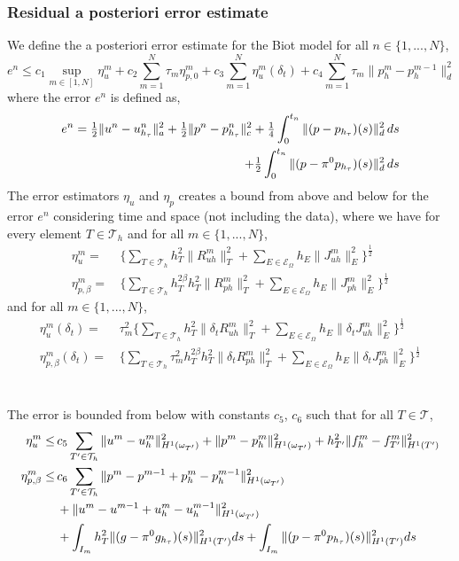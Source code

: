 \subsubsection{Residual a posteriori error estimate} \label{biot:res_err}
We define the a posteriori error estimate for the Biot model for all $n \in \{1,...,N\}$,
\begin{equation} \label{biot_e_upper_bd}
e^n \leq c_1\sup_{m \in [1,N]} \eta^m_u + c_2 \sum_{m=1}^N \tau_m \eta^m_{p,0} + c_3\sum_{m=1}^N \eta^m_u(\delta_t)+ c_4\sum_{m=1}^N \tau_m \|p^m_h - p^{m-1}_h\|_d^2
\end{equation}
where the error $e^n$ is defined as,
\begin{align}
e^n = \tfrac{1}{2}\|u^n - u^n_{h_\tau} \|^2_a + \tfrac{1}{2}\|p^n - p^n_{h_\tau} \|^2_c
+ \tfrac{1}{4}\int_0^{t_n} \|(p - p_{h_\tau})(s) \|^2_d \, ds \\
+ \tfrac{1}{2}\int_0^{t_n} \|(p - \pi^0p_{h_\tau})(s) \|^2_d \, ds \notag
\end{align}
The error estimators $\eta_u$ and $\eta_p$ creates a bound from above and below for the error $e^n$ considering time and space (not including the data), where we have for every element $T \in \mathcal{T}_h$ and for all $m \in \{1,...,N\}$,
\begin{align}
\eta^m_u = & \,\bigl\{\sum_{T \in \mathcal{T}_h} h_T^2 \|R^m_{uh}\|_T^2 + \sum_{E \in \mathcal{E}_\Omega} h_E \|J^m_{uh}\|_E^2 \bigr\}^{\frac{1}{2}} \\
\eta^m_{p,\beta} = & \, \bigl\{\sum_{T \in \mathcal{T}_h} h_T^{2\beta} h_T^2 \|R^m_{ph}\|_T^2  + \sum_{E \in \mathcal{E}_\Omega} h_E \|J^m_{ph}\|_E^2 \bigr\}^{\frac{1}{2}}
\end{align}
and for all $m \in \{1,...,N\}$,
\begin{align}
\eta^m_u(\delta_t) = & \, \tau_m^2 \bigl\{\sum_{T \in \mathcal{T}_h} h_T^2 \|\delta_t R^m_{uh}\|_T^2 + \sum_{E \in \mathcal{E}_\Omega} h_E \|\delta_t J^m_{uh}\|_E^2 \bigr\}^{\frac{1}{2}} \\
\eta^m_{p,\beta}(\delta_t) = & \, \bigl\{\sum_{T \in \mathcal{T}_h} \tau_m^2 h_T^{2\beta} h_T^2 \|\delta_t R^m_{ph}\|_T^2  + \sum_{E \in \mathcal{E}_\Omega} h_E \|\delta_t J^m_{ph}\|_E^2 \bigr\}^{\frac{1}{2}}
\end{align}
\\
\\
The error is bounded from below with constants $c_5$, $c_6$ such that for all $T \in \mathcal{T}$,
\begin{align}
\eta^m_u \leq & \, c_5\sum_{T' \in \mathcal{T}_h} \|u^m-u^m_h \|^2_{H^1(\omega_{T'})} + \|p^m-p^m_h \|^2_{H^1(\omega_{T'})} + h_{T'}^2 \|f^m_h-f^m_{T'}\|^2_{H^1(T')} \\
\eta^m_{p,\beta} \leq & \, c_6 \sum_{T' \in \mathcal{T}_h} \|p^m-p^{m-1} + p_h^m-p_h^{m-1} \|^2_{H^1(\omega_{T'})} \notag\\
& \, + \|u^m-u^{m-1} + u_h^m-u_h^{m-1} \|^2_{H^1(\omega_{T'})} \notag\\
& \, + \int_{I_m} h_{T}^2 \|(g-\pi^0g_{h_\tau})(s)\|^2_{H^1(T')} ds + \int_{I_m} \|(p-\pi^0p_{h_\tau})(s)\|^2_{H^1(T')} ds \notag
\end{align}
